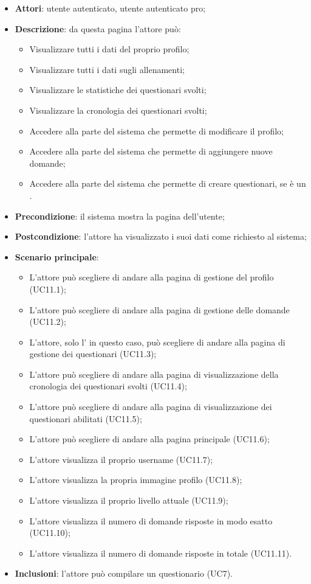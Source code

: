 \begin{itemize}
\item\textbf{Attori}: utente autenticato, utente autenticato pro;
\item\textbf{Descrizione}: da questa pagina l'attore può: 
\begin{itemize}
	\item Visualizzare tutti i dati del proprio profilo;
	\item Visualizzare tutti i dati sugli allenamenti;
	\item Visualizzare le statistiche dei questionari svolti;
	\item Visualizzare la cronologia dei questionari svolti;
	\item Accedere alla parte del sistema che permette di modificare il profilo;
	\item Accedere alla parte del sistema che permette di aggiungere nuove domande;
	\item Accedere alla parte del sistema che permette di creare questionari, se è un \uaupro{}.
\end{itemize}
\item\textbf{Precondizione}: il sistema mostra la pagina dell'utente;
\item\textbf{Postcondizione}: l'attore ha visualizzato i suoi dati come richiesto al sistema;
\item\textbf{Scenario principale}:
\begin{itemize}
\item L'attore può scegliere di andare alla pagina di gestione del profilo (UC11.1);
\item L'attore può scegliere di andare alla pagina di gestione delle domande (UC11.2);  
\item L'attore, solo l'\uaupro{} in questo caso, può scegliere di andare alla pagina di gestione dei questionari (UC11.3);
\item L'attore può scegliere di andare alla pagina di visualizzazione della cronologia dei questionari svolti (UC11.4);
\item L'attore può scegliere di andare alla pagina di visualizzazione dei questionari abilitati (UC11.5);
\item L'attore può scegliere di andare alla pagina principale (UC11.6);
\item L'attore visualizza il proprio username (UC11.7);
\item L'attore visualizza la propria immagine profilo (UC11.8);
\item L'attore visualizza il proprio livello attuale (UC11.9);
\item L'attore visualizza il numero di domande risposte in modo esatto (UC11.10);
\item L'attore visualizza il numero di domande risposte in totale (UC11.11).
\end{itemize}
\item\textbf{Inclusioni}: l'attore può compilare un questionario (UC7).
\end{itemize}

